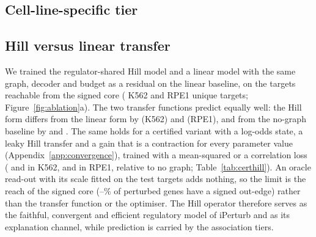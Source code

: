 \begin{table}[!t]
\centering
\caption{\textbf{Each evidence tier as a propagation graph, and multi-hop read-outs.} Unique-target mean $\rho_c$ over three target-held-out folds. The response of a held-out target is the propagated, normalised response of training targets over the graph; the restart probability or the number of hops is chosen on validation targets.}
\label{tab:tiers}
\scriptsize

\end{table}

\subsection{Cell-line-specific tier}
\label{sec:ablation_context}

\subsection{Hill versus linear transfer}
\label{sec:ablation_hill}
We trained the regulator-shared Hill model and a linear model with the same graph, decoder and budget as a residual on the linear baseline, on the targets reachable from the signed core ( K562 and  RPE1 unique targets; Figure~\ref{fig:ablation}a).
The two transfer functions predict equally well: the Hill form differs from the linear form by  (K562) and  (RPE1), and from the no-graph baseline by  and .
The same holds for a certified variant with a log-odds state, a leaky Hill transfer and a gain that is a contraction for every parameter value (Appendix~\ref{app:convergence}), trained with a mean-squared or a correlation loss ( and  in K562,  and  in RPE1, relative to no graph; Table~\ref{tab:certhill}).
An oracle read-out with its scale fitted on the test targets adds nothing, so the limit is the reach of the signed core (--\% of perturbed genes have a signed out-edge) rather than the transfer function or the optimiser.
The Hill operator therefore serves as the faithful, convergent and efficient regulatory model of iPerturb and as its explanation channel, while prediction is carried by the association tiers.

